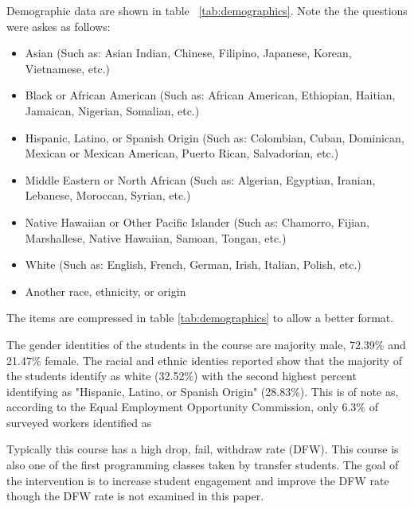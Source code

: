 \documentclass[12pt]{article}
\begin{document}
Demographic data are shown in table ~\ref{tab:demographics}. Note the the questions were askes as follows: 
\begin{itemize}
    \item Asian (Such as: Asian Indian, Chinese, Filipino, Japanese, Korean, Vietnamese, etc.) 
    \item Black or African American (Such as: African American, Ethiopian, Haitian, Jamaican, Nigerian, Somalian, etc.)
    \item Hispanic, Latino, or Spanish Origin (Such as: Colombian, Cuban, Dominican, Mexican or Mexican American, Puerto Rican, Salvadorian, etc.)
    \item Middle Eastern or North African (Such as: Algerian, Egyptian, Iranian, Lebanese, Moroccan, Syrian, etc.)
    \item Native Hawaiian or Other Pacific Islander (Such as: Chamorro, Fijian, Marshallese, Native Hawaiian, Samoan, Tongan, etc.)
    \item  White (Such as: English, French, German, Irish, Italian, Polish, etc.)
    \item Another race, ethnicity, or origin
\end{itemize}
The items are compressed in table \ref{tab:demographics} to allow a better format.

The gender identities of the students in the course are majority male, 72.39\% and 21.47\% female.  The racial and ethnic identies reported show that the majority of the students identify as white (32.52\%) with the second highest percent identifying as "Hispanic, Latino, or Spanish Origin" (28.83\%). This is of note as, according to the Equal Employment Opportunity Commission, only 6.3\% of surveyed workers identified as  \cite{DIVERSITYHIGHTECH}

Typically this course has a high drop, fail, withdraw rate (DFW).  This course is also one of the first programming classes taken by transfer students.  The goal of the intervention is to increase student engagement and improve the DFW rate though the DFW rate is not examined in this paper.  
{}
\end{document}
